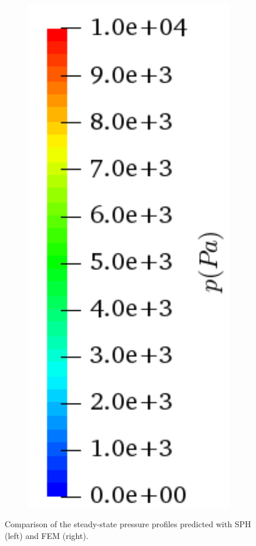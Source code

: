 \documentclass[final,3p,times]{elsarticle}
\begin{document}
\begin{figure}[H]
\begin{subfigure}{0.15\columnwidth}
		\includegraphics[width=1.0\textwidth]{Images/CD_p.png}
	\end{subfigure}
	\caption{Comparison of the steady-state pressure profiles predicted with  SPH (left) and FEM (right).}	\label{fig:CD}
\end{figure} 
\end{document}
